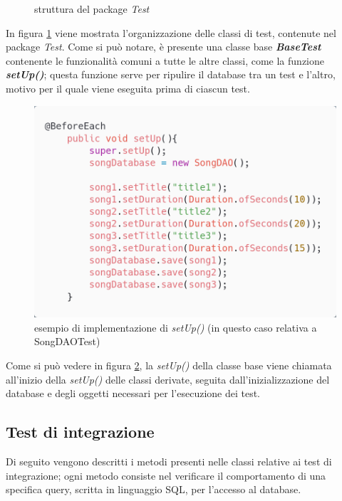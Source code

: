 \documentclass{article}
\begin{document}
  \begin{figure}[H]
    \centering
    
    \caption{struttura del package \textit{Test}}
    \label{fig:testsUML}
  \end{figure}

  In figura \ref{fig:testsUML} viene mostrata l'organizzazione delle classi di test, contenute nel package \textit{Test}. Come si può notare, è presente una classe base \textbf{\textit{BaseTest}} contenente le funzionalità comuni a tutte le altre classi, come la funzione \textbf{\textit{setUp()}}; questa funzione serve per ripulire il database tra un test e l'altro, motivo per il quale viene eseguita prima di ciascun test.

  \begin{figure}[H]
    \centering
    \includegraphics[width=0.5\linewidth]{setUp.png}
    \caption{esempio di implementazione di \textit{setUp()} (in questo caso relativa a SongDAOTest)}
    \label{fig:setUp}
  \end{figure}


  Come si può vedere in figura \ref{fig:setUp}, la \textit{setUp()} della classe base viene chiamata all'inizio della \textit{setUp()} delle classi
  derivate, seguita dall'inizializzazione del database e degli oggetti necessari per l'esecuzione dei test.

  \subsection{Test di integrazione}
  Di seguito vengono descritti i metodi presenti nelle classi relative ai test di integrazione; ogni metodo consiste nel verificare il comportamento di una specifica query, scritta in linguaggio SQL, per l'accesso al database.
\end{document}
